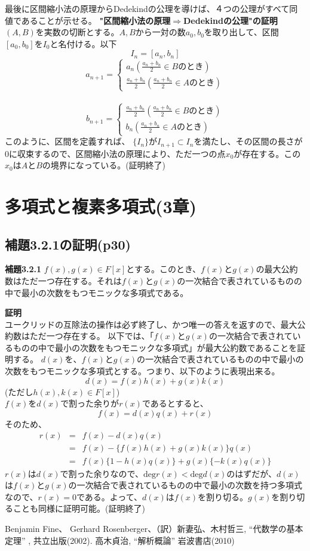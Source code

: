 \documentclass[10pt]{jarticle}
\begin{document}
最後に区間縮小法の原理からDedekindの公理を導けば、４つの公理がすべて同値であることが示せる。
\textbf{"区間縮小法の原理$\Longrightarrow$Dedekindの公理"の証明}\\
$(A,B)$を実数の切断とする。$A,B$から一対の数$a_0,b_0$を取り出して、区間$[a_0,b_0]$を$I_0$と名付ける。以下
\[I_n=[a_n,b_n]\]
\[
  a_{n+1}=\begin{cases}
    a_n　(\frac{a_n+b_n}{2}\in Bのとき)\\
    \frac{a_n+b_n}{2}(\frac{a_n+b_n}{2}\in Aのとき)
  \end{cases}
\]\\
\[
  b_{n+1}=\begin{cases}
     \frac{a_n+b_n}{2}(\frac{a_n+b_n}{2}\in Bのとき)\\
    b_n(\frac{a_n+b_n}{2}\in Aのとき)
  \end{cases}
\]
このように、区間を定義すれば、
$\{I_n\}$が$I_{n+1}\subset I_n$を満たし、その区間の長さが$0$に収束するので、区間縮小法の原理により、ただ一つの点$x_0$が存在する。この$x_0$は$A$と$B$の境界になっている。(証明終了)

\newpage


\section{多項式と複素多項式(3章)}
\subsection{補題3.2.1の証明(p30)}

\begin{itembox}[l]{\textbf{補題3.2.1}}
$f(x),g(x)\in F[x]$とする。このとき、$f(x)$と$g(x)$の最大公約数はただ一つ存在する。それは$f(x)$と$g(x)$の一次結合で表されているものの中で最小の次数をもつモニックな多項式である。
\end{itembox}

\textbf{証明}\\
ユークリッドの互除法の操作は必ず終了し、かつ唯一の答えを返すので、最大公約数はただ一つ存在する。
以下では、「$f(x)$と$g(x)$の一次結合で表されているものの中で最小の次数をもつモニックな多項式」が最大公約数であることを証明する。
$d(x)$を、$f(x)$と$g(x)$の一次結合で表されているものの中で最小の次数をもつモニックな多項式とする。つまり、以下のように表現出来る。
\[d(x)=f(x)h(x)+g(x)k(x)\]
(ただし$h(x),k(x)\in F[x]$)\\
$f(x)$を$d(x)$で割った余りが$r(x)$であるとすると、
\[f(x)=d(x)q(x)+r(x)\]
そのため、
\begin{eqnarray*}r(x) &=& f(x)-d(x)q(x)\\
&=&f(x)-\{f(x)h(x)+g(x)k(x)\}q(x)\\
&=& f(x)\{1-h(x)q(x)\}+g(x)\{-k(x)q(x)\}
\end{eqnarray*}
$r(x)$は$d(x)$で割った余りなので、$\mathrm{deg}r(x)<\mathrm{deg}d(x)$のはずだが、$d(x)$は$f(x)$と$g(x)$の一次結合で表されているものの中で最小の次数を持つ多項式なので、$r(x)=0$である。よって、$d(x)$は$f(x)$を割り切る。$g(x)$を割り切ることも同様に証明可能。(証明終了)\\



\newpage

\begin{thebibliography}{9}
   Benjamin Fine、 Gerhard Rosenberger、（訳）新妻弘、木村哲三,
    ``代数学の基本定理'' ,
    共立出版(2002).
   高木貞治,
    ``解析概論'' 岩波書店(2010)
\end{thebibliography}
\end{document}
